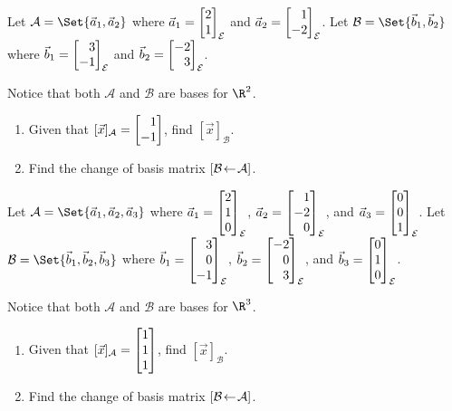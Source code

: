 \begin{exercises}
	\begin{problist}
		\prob Let $\mathcal A=\Set{\vec a_1,\vec a_2}$ where $\vec a_1=\mat{2\\1}_{\mathcal E}$ and $\vec a_2=\mat{1\\-2}_{\mathcal E}$.
		Let $\mathcal B=\Set{\vec b_1,\vec b_2}$ where $\vec b_1=\mat{3\\-1}_{\mathcal E}$ and $\vec b_2=\mat{-2\\3}_{\mathcal E}$.
		
		Notice that both $\mathcal A$ and $\mathcal B$ are bases for $\R^2$.
	    \begin{enumerate}
	        \item Given that $[\vec x]_{\mathcal A}=\mat{1\\-1}$, find $[\vec x]_{\mathcal B}$.
	        \item Find the change of basis matrix $\BasisChange{\mathcal A}{\mathcal B}$.
	    \end{enumerate}
	    
	    \prob Let $\mathcal A=\Set{\vec a_1,\vec a_2,\vec a_3}$ where $\vec a_1=\mat{2\\1\\0}_{\mathcal E}$, $\vec a_2=\mat{1\\-2\\0}_{\mathcal E}$, and $\vec a_3=\mat{0\\0\\1}_{\mathcal E}$.
	    Let $\mathcal B=\Set{\vec b_1,\vec b_2,\vec b_3}$ where $\vec b_1=\mat{3\\0\\-1}_{\mathcal E}$, $\vec b_2=\mat{-2\\0\\3}_{\mathcal E}$, and $\vec b_3=\mat{0\\1\\0}_{\mathcal E}$.
	    
	    Notice that both $\mathcal A$ and $\mathcal B$ are bases for $\R^3$. 
	    \begin{enumerate}
	        \item Given that $[\vec x]_{\mathcal A}=\mat{1\\1\\1}$, find $[\vec x]_{\mathcal B}$.
	        \item Find the change of basis matrix $\BasisChange{\mathcal A}{\mathcal B}$.
	    \end{enumerate}
	    

\end{problist}
\end{exercises}
